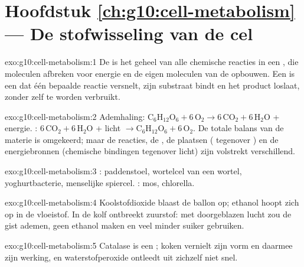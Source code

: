 \section*{Hoofdstuk \ref{ch:g10:cell-metabolism} --- De stofwisseling van de cel}

\begin{solution}{exo:g10:cell-metabolism:1}
De  is het geheel van alle chemische reacties in een ,
die moleculen afbreken voor energie en de eigen moleculen van de 
opbouwen. Een  is een  dat één bepaalde reactie versnelt, zijn
substraat bindt en het product loslaat, zonder zelf te worden verbruikt.
\end{solution}

\begin{solution}{exo:g10:cell-metabolism:2}
Ademhaling: $\mathrm{C_6H_{12}O_6} + 6\,\mathrm{O_2} \to
6\,\mathrm{CO_2} + 6\,\mathrm{H_2O}$ + energie. :
$6\,\mathrm{CO_2} + 6\,\mathrm{H_2O}$ + licht $\to \mathrm{C_6H_{12}O_6}
+ 6\,\mathrm{O_2}$. De totale balans van de materie is omgekeerd; maar
de reacties, de , de plaatsen ( tegenover
) en de energiebronnen (chemische bindingen tegenover
licht) zijn volstrekt verschillend.
\end{solution}

\begin{solution}{exo:g10:cell-metabolism:3}
: paddenstoel, wortelcel van een wortel, yoghurtbacterie,
menselijke spiercel. : mos, chlorella.
\end{solution}

\begin{solution}{exo:g10:cell-metabolism:4}
Koolstofdioxide blaast de ballon op; ethanol hoopt zich op in de
vloeistof. In de kolf ontbreekt zuurstof: met doorgeblazen lucht zou de
gist ademen, geen ethanol maken en veel minder suiker gebruiken.
\end{solution}

\begin{solution}{exo:g10:cell-metabolism:5}
Catalase is een ; koken vernielt zijn vorm en daarmee zijn werking,
en waterstofperoxide ontleedt uit zichzelf niet snel.
\end{solution}

